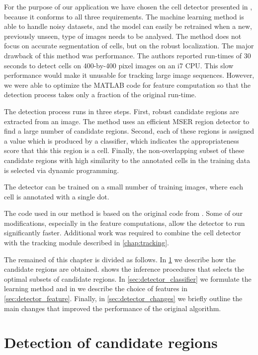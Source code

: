	For the purpose of our application we have chosen the cell detector presented in \cite{arteta12}, because it conforms to all three requirements. The machine learning method is able to handle noisy datasets, and the model can easily be retrained when a new, previously unseen, type of images needs to be analysed. The method does not focus on accurate segmentation of cells, but on the robust localization. The major drawback of this method was performance. The authors reported run-times of 30 seconds to detect cells on 400-by-400 pixel images on an i7 CPU. This slow performance would make it unusable for tracking large image sequences. However, we were able to optimize the MATLAB code for feature computation so that the detection process takes only a fraction of the original run-time.
	
	The detection process runs in three steps. First, robust candidate regions are extracted from an image. The method uses an efficient MSER region detector \addref{} to find a large number of candidate regions. Second, each of these regions is assigned a value which is produced by a classifier, which indicates the appropriateness score that this this region is a cell. Finally, the non-overlapping subset of these candidate regions with high similarity to the annotated cells in the training data is selected via dynamic programming.
	
	The detector can be trained on a small number of training images, where each cell is  annotated with a single dot. 

	The code used in our method is based on the original code from \cite{arteta12}. Some of our modifications, especially in the feature computations, allow the detector to run significantly faster. Additional work was required to combine the cell detector with the tracking module described in \cref{chap:tracking}.
	
	The remained of this chapter is divided as follows. In \cref{sec:detector_extremal} we describe how the candidate regions are obtained.  shows the inference procedures that selects the optimal subsets of candidate regions. In \cref{sec:detector_classifier} we formulate the learning method and in we describe the choice of features in \cref{sec:detector_feature}. Finally, in \cref{sec:detector_changes} we briefly outline the main changes that improved the performance of the original algorithm.
	
	\section{Detection of candidate regions \statusnew}
	\label{sec:detector_extremal}
	
